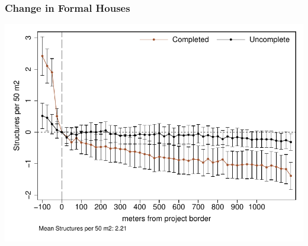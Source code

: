 \documentclass[aspectratio=149]{beamer}
\begin{document}
\begin{frame}
\frametitle{Change in Formal Houses}
\begin{center}
\includegraphics[scale=.78]{distplot_bblu_for.pdf}
\vspace{-3mm}
\end{center}
\end{frame}
\end{document}
